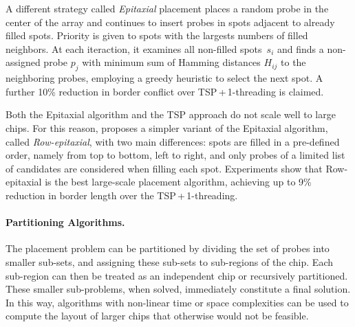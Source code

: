 \documentclass{llncs}
\newcommand{\ignore}[1]{}
\begin{document}
A different strategy called \emph{Epitaxial} placement
\cite{KAHNG02} places a random probe in the center of the array and continues
to insert probes in spots adjacent to already filled spots. Priority is given
to spots with the largests numbers of filled neighbors. At each iteraction, it
examines all non-filled spots~$s_i$ and finds a non-assigned probe $p_j$ with
minimum sum of Hamming distances $H_{ij}$ to the neighboring probes, employing
a greedy heuristic to select the next spot.  A further 10\% reduction in
border conflict over TSP\,+\,1-threading is claimed.

\ignore{
The major problem with the Epitaxial and the TSP-based algorithm is that they
have at least quadratic time complexity and thus are not scalable for the
latest million-probe microarrays. According to their experiments, the TSP
approach needed around 32 minutes to produce the layout of a 200\,x\,200
chip, whereas the Epitaxial algorithm needed 74 minutes on average. For a
500\,x\,500 chip, the TSP took over 30 hours to complete, whereas the
Epitaxial algorithm did not complete ``due to prohibitively large running
time or memory requirements'' \cite{KAHNG02}.
}

\ignore{
This observation has led to the development of two new algorithms by
\cite{KAHNG03A}. The first one, called Sliding-window Matching (SWM), is not
exactly a placement algorithm as it iteratively improves an initial placement
that can be constructed by, for instance, TSP and 1-threading. Improvements
are achieved by selecting an independent set of spots inside the window and
optimally replacing their probes using a minimum-weight perfect matching
algorithm. The term independent refers to probes that can be replaced without
affecting the border length of the other selected probes.
}

Both the Epitaxial algorithm and the TSP approach do not scale well to large
chips. For this reason, \cite{KAHNG03A} proposes a simpler variant of the
Epitaxial algorithm, called \emph{Row-epitaxial}, with two main differences:
spots are filled in a pre-defined order, namely from top to bottom, left to
right, and only probes of a limited list of candidates are considered when
filling each spot. Experiments show that Row-epitaxial is the best
large-scale placement algorithm, achieving up to 9\% reduction in border
length over the TSP\,+\,1-threading.


\paragraph{Partitioning Algorithms.}
The placement problem can be partitioned by dividing the set of probes into
smaller sub-sets, and assigning these sub-sets to sub-regions of the chip.
Each sub-region can then be treated as an independent chip or recursively
partitioned. These smaller sub-problems, when solved, immediately constitute a
final solution. In this way, algorithms with non-linear time or space
complexities can be used to compute the layout of larger chips that otherwise
would not be feasible.
\end{document}
